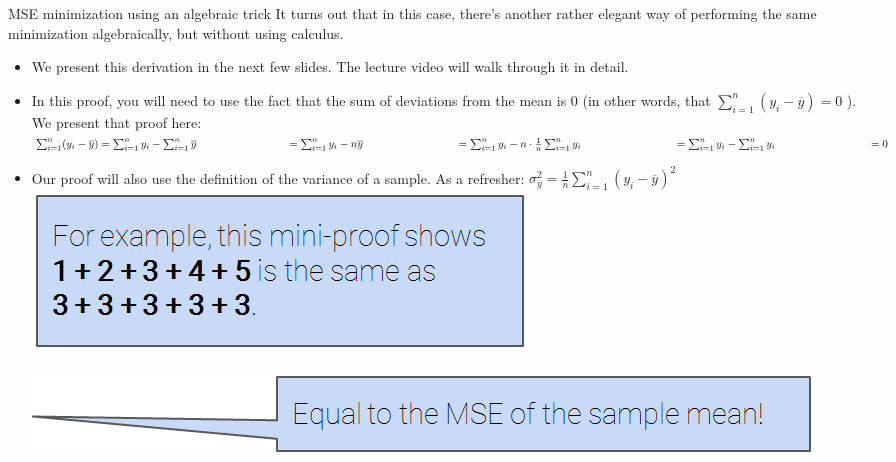 \documentclass[aspectratio=169]{../latex_main/tntbeamer}  %
\begin{document}
	
	\begin{frame}{MSE minimization using an algebraic trick}
	    \vspace{-.5cm}
	    It turns out that in this case, there’s another rather elegant way of performing the same minimization algebraically, but without using calculus.
	    \begin{itemize}
	        \item We present this derivation in the next few slides. The lecture video will walk through it in detail.
	        \item In this proof, you will need to use the fact that the sum of deviations from the mean is 0 (in other words, that        $\sum\limits_{i=1}^n(y_i - \overline{y}) = 0$               ). We present that proof here:\\
	            $\sum_{i=1}^n(y_i - \overline{y}) = \sum_{i=1}^ny_i - \sum_{i=1}^n\overline{y}\\
	           \hspace{2.9cm} = \sum_{i=1}^ny_i - n\overline{y} \\
	           \hspace{3cm}= \sum_{i=1}^ny_i - n\cdot \frac{1}{n} \sum_{i=1}^ny_i \\
	           \hspace{3cm}= \sum_{i=1}^ny_i - \sum_{i=1}^ny_i\\
	            \hspace{3cm}= 0$
	            
	        \item Our proof will also use the definition of the variance of a sample. As a refresher:
	        $\sigma_y^2 = \frac{1}{n}\sum_{i=1}^n(y_i - \overline{y})^2$\\
	        \vspace{-3.5cm}
	        \hspace{8cm}\includegraphics[scale=.5]{Bild31}\\
	        \vspace{3.5cm}
	        
	        
	        \vspace{-2.7cm}
	        \hspace{4cm}\includegraphics[scale=.3]{Bild32}\\
	        \vspace{2.7cm}
	    \end{itemize}
	\end{frame}
	
\end{document}
